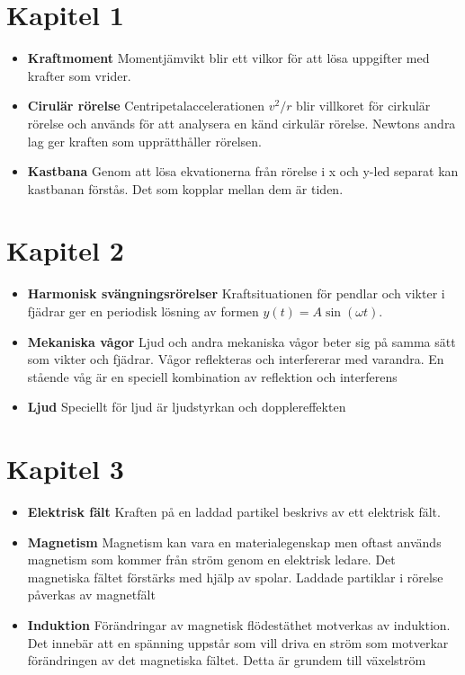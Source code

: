 \documentclass[11pt]{article}
\begin{document}
\section{Kapitel 1}
    \begin{itemize}
    \item{\textbf{Kraftmoment} Momentjämvikt blir ett vilkor för att lösa uppgifter med krafter som vrider.}

    \item{\textbf{Cirulär rörelse} Centripetalaccelerationen $v^{2}/r$ blir villkoret för cirkulär rörelse och används för att analysera en känd cirkulär rörelse. Newtons andra lag ger kraften som upprätthåller rörelsen.}

    \item{\textbf{Kastbana} Genom att lösa ekvationerna från rörelse i x och y-led separat kan kastbanan förstås. Det som kopplar mellan dem är tiden.}
    \end{itemize}
\section{Kapitel 2}
    \begin{itemize}
    \item{\textbf{Harmonisk svängningsrörelser} Kraftsituationen för pendlar och vikter i fjädrar ger en periodisk lösning av formen $y(t) = A \sin{ (\omega t)}$. }

    \item{\textbf{Mekaniska vågor} Ljud och andra mekaniska vågor beter sig på samma sätt som vikter och fjädrar. Vågor reflekteras och interfererar med varandra. En stående våg är en speciell kombination av reflektion och interferens}

    \item{\textbf{Ljud} Speciellt för ljud är ljudstyrkan och dopplereffekten}
    \end{itemize}
\section{Kapitel 3}
\begin{itemize}
    \item{\textbf{Elektrisk fält} Kraften på en laddad partikel beskrivs av ett elektrisk fält.}

    \item{\textbf{Magnetism} Magnetism kan vara en materialegenskap men oftast används magnetism som kommer från ström genom en elektrisk ledare. Det magnetiska fältet förstärks med hjälp av spolar. Laddade partiklar i rörelse påverkas av magnetfält}

    \item{\textbf{Induktion} Förändringar av magnetisk flödestäthet motverkas av induktion. Det innebär att en spänning uppstår som vill driva en ström som motverkar förändringen av det magnetiska fältet. Detta är grundem till växelström}
\end{itemize}
\end{document}
